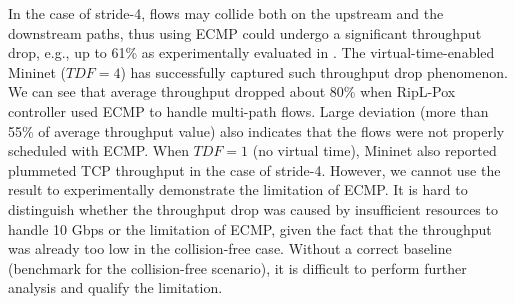 In the case of stride-4, flows may collide both on the upstream and the downstream paths, thus using ECMP could undergo a significant throughput drop, e.g., up to 61\% as experimentally evaluated in \cite{Hedera}.  The virtual-time-enabled Mininet ($TDF=4$) has successfully captured such throughput drop phenomenon. We can see that average throughput dropped about 80\% when RipL-Pox controller used ECMP to handle multi-path flows. Large deviation (more than 55\% of average throughput value) also indicates that the flows were not properly scheduled with ECMP. When $TDF=1$ (no virtual time), Mininet also reported plummeted TCP throughput in the case of stride-4. However, we cannot use the result to experimentally demonstrate the limitation of ECMP. It is hard to distinguish whether the throughput drop was caused by insufficient resources to handle 10 Gbps or the limitation of ECMP, given the fact that the throughput was already too low in the collision-free case. Without a correct baseline (benchmark for the collision-free scenario), it is difficult to perform further analysis and qualify the limitation.




